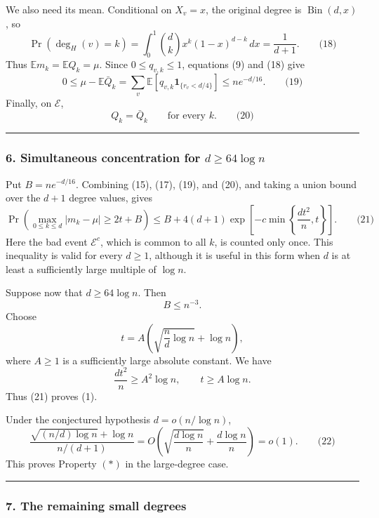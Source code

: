 \documentclass[
  11pt,
  a4paper,
]{article}
\begin{document}
We also need its mean. Conditional on \(X_v=x\), the original degree is
\(\operatorname{Bin}(d,x)\), so \[
\Pr(\deg_H(v)=k)
=
\int_0^1\binom dk x^k(1-x)^{d-k}\,dx
=
\frac1{d+1}.
\qquad\text{(18)}
\] Thus \(\mathbb Em_k=\mathbb EQ_k=\mu\). Since \(0\le q_{v,k}\le1\),
equations (9) and (18) give \[
0\le
\mu-\mathbb E\bar Q_k
=
\sum_v\mathbb E\!\left[
q_{v,k}\mathbf 1_{\{r_v<d/4\}}
\right]
\le ne^{-d/16}.
\qquad\text{(19)}
\] Finally, on \(\mathcal E\), \[
Q_k=\bar Q_k
\qquad\text{for every }k.
\qquad\text{(20)}
\]

\begin{center}\rule{0.5\linewidth}{0.5pt}\end{center}

\subsubsection{\texorpdfstring{6. Simultaneous concentration for
\(d\ge64\log n\)}{6. Simultaneous concentration for d\textbackslash ge64\textbackslash log n}}\label{simultaneous-concentration-for-dge64log-n}

Put \(B=ne^{-d/16}\). Combining (15), (17), (19), and (20), and taking a
union bound over the \(d+1\) degree values, gives \[
\boxed{
\Pr\left(
\max_{0\le k\le d}|m_k-\mu|\ge 2t+B
\right)
\le
B+
4(d+1)\exp\left[
-c\min\left\{\frac{dt^2}{n},t\right\}
\right].
}
\qquad\text{(21)}
\] Here the bad event \(\mathcal E^c\), which is common to all \(k\), is
counted only once. This inequality is valid for every \(d\ge1\),
although it is useful in this form when \(d\) is at least a sufficiently
large multiple of \(\log n\).

Suppose now that \(d\ge64\log n\). Then \[
B\le n^{-3}.
\] Choose \[
t=A\left(\sqrt{\frac nd\log n}+\log n\right),
\] where \(A\ge1\) is a sufficiently large absolute constant. We have \[
\frac{dt^2}{n}\ge A^2\log n,
\qquad
t\ge A\log n.
\] Thus (21) proves (1).

Under the conjectured hypothesis \(d=o(n/\log n)\), \[
\frac{
\sqrt{(n/d)\log n}+\log n
}{
n/(d+1)
}
=
O\left(
\sqrt{\frac{d\log n}{n}}
+
\frac{d\log n}{n}
\right)
=o(1).
\qquad\text{(22)}
\] This proves Property \((*)\) in the large-degree case.

\begin{center}\rule{0.5\linewidth}{0.5pt}\end{center}

\subsubsection{7. The remaining small
degrees}\label{the-remaining-small-degrees}
\end{document}
